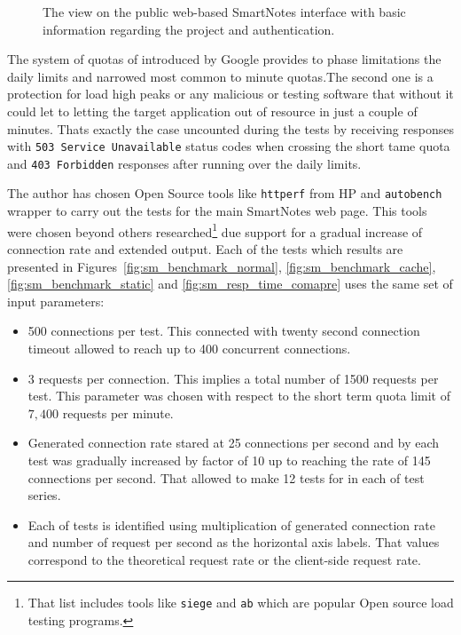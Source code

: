 \begin{figure}[ht]
\begin{center}
  \end{center}
  \caption{The view on the public web-based SmartNotes interface with basic information regarding the project and authentication.}
  \label{fig:sn_dash_view}
\end{figure}
The system of quotas of introduced by Google provides to phase limitations the daily limits and narrowed most common to minute quotas.The second one is a protection for load high peaks or any malicious or testing software that without it could let to letting the target application out of resource in just a couple of minutes. Thats exactly the case uncounted during the tests by receiving responses with \texttt{503 Service Unavailable} status codes when crossing the short tame quota and \texttt{403 Forbidden} responses after running over the daily limits.

The author has chosen Open Source tools like \texttt{httperf} from HP and \texttt{autobench} wrapper to carry out the tests for the main SmartNotes web page. This tools were chosen beyond others researched\footnote{That list includes tools like \texttt{siege} and \texttt{ab} which are popular Open source load testing programs.} due support for a gradual increase of connection rate and extended output. Each of the tests which results are presented in Figures~\ref{fig:sm_benchmark_normal}, \ref{fig:sm_benchmark_cache}, \ref{fig:sm_benchmark_static} and \ref{fig:sm_resp_time_comapre} uses the same set of input parameters:
\begin{itemize}
	\item{500 connections per test. This connected with twenty second connection timeout allowed to reach up to 400 concurrent connections.  }
	\item{3 requests per connection. This implies a total number of 1500 requests per test. This parameter was chosen with respect to the short term quota limit of $7, 400$ requests per minute.}
	\item{Generated connection rate stared at 25 connections per second and by each test was gradually increased by factor of 10 up to reaching the rate of 145 connections per second. That allowed to make 12 tests for in each of test series.}
	\item{Each of tests is identified using multiplication of generated connection rate and number of request per second as the horizontal axis labels. That values correspond to the theoretical request rate or the client-side request rate.}
\end{itemize}

